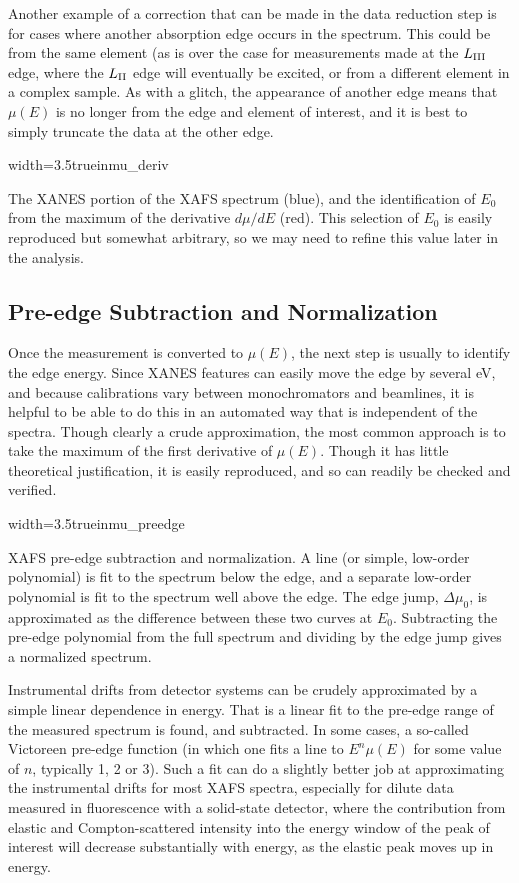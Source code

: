 Another example of a correction that can be made in the data reduction step
is for cases where another absorption edge occurs in the spectrum.  This
could be from the same element (as is over the case for measurements made
at the $L_{\rm III}$ edge, where the $L_{\rm II}$ edge will eventually be
excited, or from a different element in a complex sample.  As with a
glitch, the appearance of another edge means that $\mu(E)$ is no longer
from the edge and element of interest, and it is best to simply truncate
the data at the other edge.

\begin{Nfig}{width=3.5truein}{mu_deriv}
  \caption{The XANES portion of the XAFS spectrum (blue), and the
    identification of $E_0$ from the maximum of the derivative $d\mu/dE$
    (red).  This selection of $E_0$ is easily reproduced but somewhat
    arbitrary, so we may need to refine this value later in the analysis.}
  \label{Fig:RED:e0}
\end{Nfig}

\subsection{Pre-edge Subtraction and Normalization}

Once the measurement is converted to $\mu(E)$, the next step is usually to
identify the edge energy.  Since XANES features can easily move the edge by
several eV, and because calibrations vary between monochromators and
beamlines, it is helpful to be able to do this in an automated way that is
independent of the spectra.  Though clearly a crude approximation, the most
common approach is to take the maximum of the first derivative of $\mu(E)$.
Though it has little theoretical justification, it is easily reproduced,
and so can readily be checked and verified.


\begin{Nfig}{width=3.5truein}{mu_preedge}
  \caption{XAFS pre-edge subtraction and normalization. A line (or simple,
    low-order polynomial) is fit to the spectrum below the edge, and a
    separate low-order polynomial is fit to the spectrum well above the
    edge.  The edge jump, $\Delta\mu_0$, is approximated as the difference
    between these two curves at $E_0$.  Subtracting the pre-edge polynomial
    from the full spectrum and dividing by the edge jump gives a normalized
    spectrum.}
  \label{Fig:RED:preedge}
\end{Nfig}


Instrumental drifts from detector systems can be crudely approximated by a
simple linear dependence in energy.  That is a linear fit to the pre-edge
range of the measured spectrum is found, and subtracted.  In some cases, a
so-called Victoreen pre-edge function (in which one fits a line to $E^{n}
\mu(E)$ for some value of $n$, typically 1, 2 or 3).  Such a fit can do a
slightly better job at approximating the instrumental drifts for most XAFS
spectra, especially for dilute data measured in fluorescence with a
solid-state detector, where the contribution from elastic and
Compton-scattered intensity into the energy window of the peak of interest
will decrease substantially with energy, as the elastic peak moves up in
energy.

